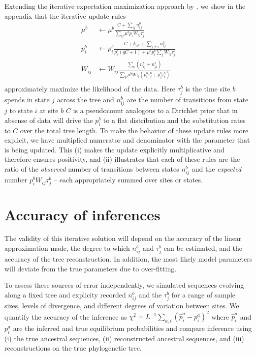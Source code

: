 \documentclass[aps,rmp,twocolumn]{revtex4}
\newcommand{\eqp}{p}
\begin{document}
Extending the iterative expectation maximization approach by \citet{bruno1996modeling}, we show in the appendix that the iterative update rules
\begin{equation}
\label{eq:update}
	\begin{split}
		\mu^b & \leftarrow \mu^b\frac{C+\sum_{ij} n^b_{ij}}{\sum_{ij}\mu^b \eqp_{i}W_{ij}\tau_j^b} \\
		\eqp^b_i & \leftarrow \eqp^b_i\frac{C+\delta_{is^{b}} + \sum_{j\neq i} n^b_{ij}}{\eqp^b_i(qC+1) + \mu^b\eqp^b_i \sum_{j}W_{ij}\tau_j^b} \\
		W_{ij} & \leftarrow W_{ij}\frac{\sum_b (n^b_{ij}+n^b_{ji})}{\sum_b \mu^b W_{ij}(\eqp_i^b\tau_j^b + \eqp_j^b \tau_i^b)} \\
	\end{split}
\end{equation}
approximately maximize the likelihood of the data.
Here $\tau^b_j$ is the time site $b$ spends in state $j$ across the tree and $n^b_{ij}$ are the number of transitions from state $j$ to state $i$ at site $b$
$C$ is a pseudocount analogous to a Dirichlet prior that  in absense of data will drive the $\eqp_i^b$ to a flat distribution and the substitution rates to $C$ over the total tree length.
To make the behavior of these update rules more explicit, we have multiplied numerator and denominator with the parameter that is being updated. This (i) makes the update explicitly multiplicative and therefore ensures positivity, and (ii) illustrates that each of these rules are the ratio of the {\it observed} number of transitions between states $n^b_{ij}$ and the {\it expected} number $\eqp^b_i W_{ij}\tau_j^b$ -- each appropriately summed over sites or states.

\section*{Accuracy of inferences}
The validity of this iterative solution will depend on the accuracy of the linear approximation made, the degree to which $n_{ij}^b$ and $\tau_{j}^b$ can be estimated, and the accuracy of the tree reconstruction.
In addition, the most likely model parameters will deviate from the true parameters due to over-fitting.

To assess these sources of error independently, we simulated sequences evolving along a fixed tree and explicity recorded $n_{ij}^b$ and the $\tau_j^b$ for a range of sample sizes, levels of divergence, and different degrees of variation between sites.
We quantify the accuracy of the inference as $\chi^2 = L^{-1}\sum_{a,i}(\hat{\eqp}_i^a - \eqp_i^a)^2$ where $\hat{\eqp}_i^a$ and $\eqp_i^a$ are the inferred and true equilibrium probabilities and compare inference using (i) the true ancestral sequences, (ii) reconstructed ancestral sequences, and (iii) reconstructions on the true phylogenetic tree.
\end{document}
